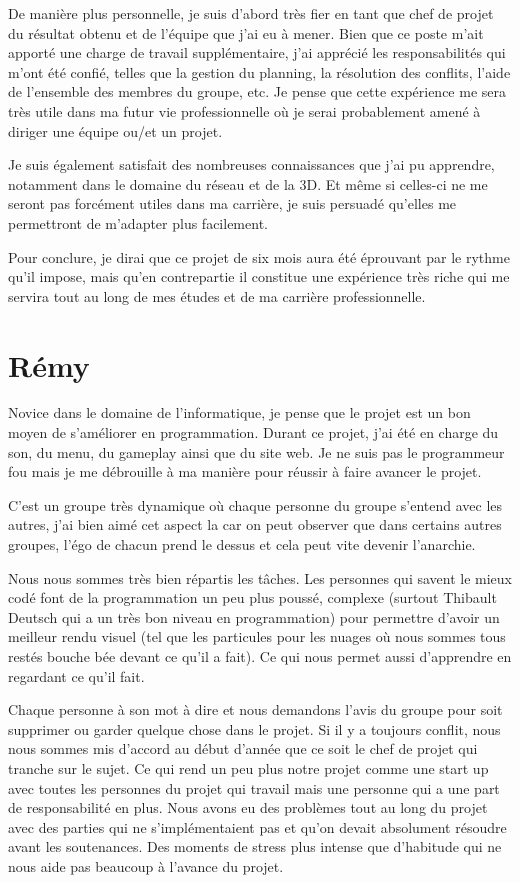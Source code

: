 \documentclass[11pt]{report}
\begin{document}
De manière plus personnelle, je suis d’abord très fier en tant que chef de projet du résultat obtenu et de l’équipe que j’ai eu à mener. Bien que ce poste m’ait apporté une charge de travail supplémentaire, j’ai apprécié les responsabilités qui m’ont été confié, telles que la gestion du planning, la résolution des conflits, l’aide de l’ensemble des membres du groupe, etc. Je pense que cette expérience me sera très utile dans ma futur vie professionnelle où je serai probablement amené à diriger une équipe ou/et un projet.

Je suis également satisfait des nombreuses connaissances que j’ai pu apprendre, notamment dans le domaine du réseau et de la 3D. Et même si celles-ci ne me seront pas forcément utiles dans ma carrière, je suis persuadé qu’elles me permettront de m’adapter plus facilement.

Pour conclure, je dirai que ce projet de six mois aura été éprouvant par le rythme qu’il impose, mais qu’en contrepartie il constitue une expérience très riche qui me servira tout au long de mes études et de ma carrière professionnelle.

\section{Rémy}

Novice dans le domaine de l'informatique, je pense que le projet est un bon moyen de s'améliorer en programmation. Durant ce projet, j'ai été en charge du son, du menu, du gameplay ainsi que du site web. Je ne suis pas le programmeur fou mais je me débrouille à ma manière pour réussir à faire avancer le projet.

C’est un groupe très dynamique où chaque personne du groupe s’entend avec les autres, j’ai bien aimé cet aspect la car on peut observer que dans certains autres groupes, l’égo de chacun prend le dessus et cela peut vite devenir l’anarchie.

Nous nous sommes très bien répartis les tâches. Les personnes qui savent le mieux codé font de la programmation un peu plus poussé, complexe (surtout Thibault Deutsch qui a un très bon niveau en programmation) pour permettre d’avoir un meilleur rendu visuel (tel que les particules pour les nuages où nous sommes tous restés bouche bée devant ce qu’il a fait). Ce qui nous permet aussi d’apprendre en regardant ce qu’il fait.

Chaque personne à son mot à dire et nous demandons l’avis du groupe pour soit supprimer ou garder quelque chose dans le projet. Si il y a toujours conflit, nous nous sommes mis d’accord au début d’année que ce soit le chef de projet qui tranche sur le sujet. Ce qui rend un peu plus notre projet comme une start up avec toutes les personnes du projet qui travail mais une personne qui a une part de responsabilité en plus.
Nous avons eu des problèmes tout au long du projet avec des parties qui ne s’implémentaient pas et qu’on devait absolument résoudre avant les soutenances. Des moments de stress plus intense que d’habitude qui ne nous aide pas beaucoup à l’avance du projet.
\end{document}

